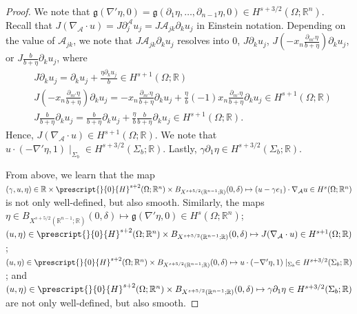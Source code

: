 \documentclass[11pt,letterpaper,reqno]{amsart}
\numberwithin{equation}{section}
\begin{document}
\begin{proof}
    We note that \(\mathfrak{g}(\nabla'\eta,0)=\mathfrak{g}(\partial_{1}\eta, \dots, \partial_{n-1}\eta,0) \in H^{s+3/2}(\Omega;\mathbb{R}^{n})\). Recall that \(J(\nabla_{\mathcal{A}} \cdot u)=J\partial_{j}^{\mathcal{A}}u_{j}=J\mathcal{A}_{jk}\partial_{k}u_{j}\) in Einstein notation. Depending on the value of \(\mathcal{A}_{jk}\), we note that \(J\mathcal{A}_{jk}\partial_{k}u_{j}\) resolves into \(0\), \(J\partial_{k}u_{j}\), \(J(-x_{n}\frac{\partial_{m'}\eta}{b+\eta})\partial_{k}u_{j}\), or \(J\frac{b}{b+\eta}\partial_{k}u_{j}\), where
    \begin{align}
        &J\partial_{k}u_{j}=\partial_{k}u_{j}+\frac{\eta \partial_{k}u_{j}}{b} \in H^{s+1}(\Omega;\mathbb{R}) \\
        &J(-x_{n}\frac{\partial_{m'}\eta}{b+\eta})\partial_{k}u_{j}=-x_{n}\frac{\partial_{m'}\eta}{b+\eta}\partial_{k}u_{j}+\frac{\eta}{b}(-1)x_{n}\frac{\partial_{m'}\eta}{b+\eta}\partial_{k}u_{j} \in H^{s+1}(\Omega;\mathbb{R}) \\
        &J\frac{b}{b+\eta}\partial_{k}u_{j}=\frac{b}{b+\eta}\partial_{k}u_{j}+\frac{\eta}{b}\frac{b}{b+\eta}\partial_{k}u_{j} \in H^{s+1}(\Omega;\mathbb{R}).
    \end{align}
    Hence, \(J(\nabla_{\mathcal{A}} \cdot u) \in H^{s+1}(\Omega;\mathbb{R})\). We note that \(u \cdot (-\nabla'\eta,1)\mid_{\Sigma_{b}} \in H^{s+3/2}(\Sigma_{b};\mathbb{R})\). Lastly, \(\gamma\partial_{1}\eta \in H^{s+3/2}(\Sigma_{b};\mathbb{R})\).

    From above, we learn that the map \((\gamma,u,\eta)  \in \mathbb{R} \times \prescript{}{0}{H}^{s+2}(\Omega;\mathbb{R}^{n}) \times B_{X^{s+5/2}(\mathbb{R}^{n-1};\mathbb{R})}(0,\delta) \mapsto (u-\gamma e_{1})\cdot \nabla_{\mathcal{A}}u \in H^{s}(\Omega;\mathbb{R}^{n})\) is not only well-defined, but also smooth. Similarly, the maps \(\eta \in B_{X^{s+5/2}(\mathbb{R}^{n-1};\mathbb{R})}(0,\delta)\mapsto \mathfrak{g}(\nabla'\eta,0) \in H^{s}(\Omega;\mathbb{R}^{n})\); \((u,\eta) \in \prescript{}{0}{H}^{s+2}(\Omega;\mathbb{R}^{n}) \times B_{X^{s+5/2}(\mathbb{R}^{n-1};\mathbb{R})}(0,\delta) \mapsto J (\nabla_{\mathcal{A}} \cdot u) \in H^{s+1}(\Omega;\mathbb{R})\); \((u,\eta) \in \prescript{}{0}{H}^{s+2}(\Omega;\mathbb{R}^{n}) \times B_{X^{s+5/2}(\mathbb{R}^{n-1};\mathbb{R})}(0,\delta) \mapsto u \cdot (-\nabla'\eta,1) \mid_{\Sigma_{b}} \in H^{s+3/2}(\Sigma_{b};\mathbb{R})\); and \((u,\eta) \in \prescript{}{0}{H}^{s+2}(\Omega;\mathbb{R}^{n}) \times B_{X^{s+5/2}(\mathbb{R}^{n-1};\mathbb{R})}(0,\delta) \mapsto \gamma\partial_{1}\eta \in H^{s+3/2}(\Sigma_{b};\mathbb{R})\) are not only well-defined, but also smooth.


\end{proof}
\end{document}
